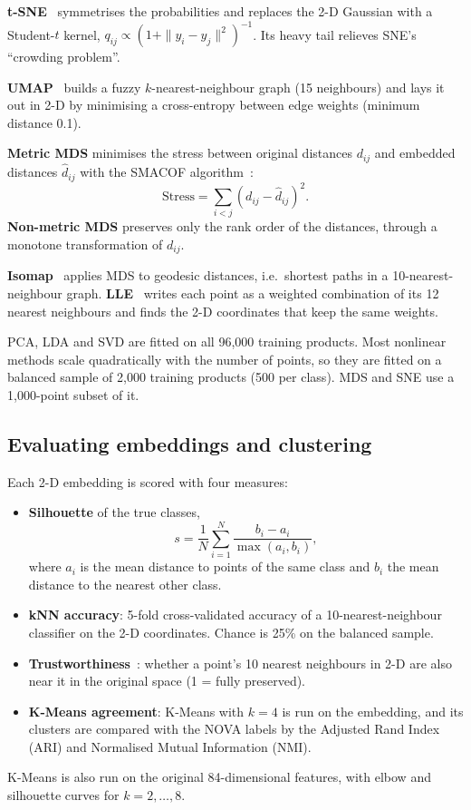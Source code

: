 \documentclass[conference]{IEEEtran}
\begin{document}
\textbf{t-SNE}~\cite{vandermaaten2008tsne} symmetrises the probabilities and replaces the 2-D Gaussian with a Student-$t$ kernel, $q_{ij} \propto (1 + \|y_i - y_j\|^2)^{-1}$. Its heavy tail relieves SNE's ``crowding problem''.

\textbf{UMAP}~\cite{mcinnes2018umap} builds a fuzzy $k$-nearest-neighbour graph (15 neighbours) and lays it out in 2-D by minimising a cross-entropy between edge weights (minimum distance 0.1).

\textbf{Metric MDS} minimises the stress between original distances $d_{ij}$ and embedded distances $\hat d_{ij}$ with the SMACOF algorithm~\cite{borg2005mds}:
\begin{equation}
\mathrm{Stress} = \sum_{i<j} \left(d_{ij} - \hat d_{ij}\right)^2.
\end{equation}
\textbf{Non-metric MDS} preserves only the rank order of the distances, through a monotone transformation of $d_{ij}$.

\textbf{Isomap}~\cite{tenenbaum2000isomap} applies MDS to geodesic distances, i.e.\ shortest paths in a 10-nearest-neighbour graph. \textbf{LLE}~\cite{roweis2000lle} writes each point as a weighted combination of its 12 nearest neighbours and finds the 2-D coordinates that keep the same weights.

PCA, LDA and SVD are fitted on all 96,000 training products. Most nonlinear methods scale quadratically with the number of points, so they are fitted on a balanced sample of 2,000 training products (500 per class). MDS and SNE use a 1,000-point subset of it.

\subsection{Evaluating embeddings and clustering}
Each 2-D embedding is scored with four measures:
\begin{itemize}
    \item \textbf{Silhouette} of the true classes,
    \begin{equation}
    s = \frac{1}{N}\sum_{i=1}^{N}\frac{b_i - a_i}{\max(a_i, b_i)},
    \end{equation}
    where $a_i$ is the mean distance to points of the same class and $b_i$ the mean distance to the nearest other class.
    \item \textbf{kNN accuracy}: 5-fold cross-validated accuracy of a 10-nearest-neighbour classifier on the 2-D coordinates. Chance is 25\% on the balanced sample.
    \item \textbf{Trustworthiness}~\cite{venna2001trust}: whether a point's 10 nearest neighbours in 2-D are also near it in the original space (1 = fully preserved).
    \item \textbf{K-Means agreement}: K-Means with $k=4$ is run on the embedding, and its clusters are compared with the NOVA labels by the Adjusted Rand Index (ARI) and Normalised Mutual Information (NMI).
\end{itemize}
K-Means is also run on the original 84-dimensional features, with elbow and silhouette curves for $k=2,\dots,8$.
\end{document}
